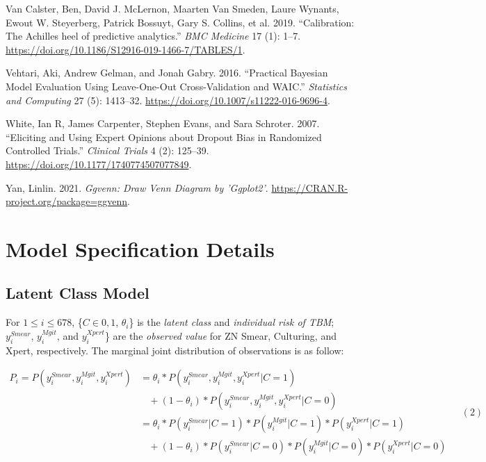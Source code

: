 \documentclass[
]{article}
\newlength{\cslhangindent}
\newlength{\cslentryspacingunit} %
\newenvironment{CSLReferences}[2] %
 {%
  \setlength{\parindent}{0pt}
  \ifodd #1
  \let\oldpar\par
  \def\par{\hangindent=\cslhangindent\oldpar}
  \fi
  \setlength{\parskip}{#2\cslentryspacingunit}
 }%
 {}
\begin{document}
\begin{CSLReferences}{1}{0}
\leavevmode{}%
Van Calster, Ben, David J. McLernon, Maarten Van Smeden, Laure Wynants, Ewout W. Steyerberg, Patrick Bossuyt, Gary S. Collins, et al. 2019. {``{Calibration: The Achilles heel of predictive analytics}.''} \emph{BMC Medicine} 17 (1): 1--7. \url{https://doi.org/10.1186/S12916-019-1466-7/TABLES/1}.

\leavevmode{}%
Vehtari, Aki, Andrew Gelman, and Jonah Gabry. 2016. {``Practical Bayesian Model Evaluation Using Leave-One-Out Cross-Validation and WAIC.''} \emph{Statistics and Computing} 27 (5): 1413--32. \url{https://doi.org/10.1007/s11222-016-9696-4}.

\leavevmode{}%
White, Ian R, James Carpenter, Stephen Evans, and Sara Schroter. 2007. {``Eliciting and Using Expert Opinions about Dropout Bias in Randomized Controlled Trials.''} \emph{Clinical Trials} 4 (2): 125--39. \url{https://doi.org/10.1177/1740774507077849}.

\leavevmode{}%
Yan, Linlin. 2021. \emph{Ggvenn: Draw Venn Diagram by 'Ggplot2'}. \url{https://CRAN.R-project.org/package=ggvenn}.

\end{CSLReferences}

\hypertarget{appendix-appendix}{%
\appendix}


\hypertarget{appendix-details}{%
\section{Model Specification Details}\label{appendix-details}}

\hypertarget{latent-class-model}{%
\subsection{Latent Class Model}\label{latent-class-model}}

For \(1 \leq i \leq 678\), \{\(C \in {0,1}\), \(\theta_i\)\} is the \emph{latent class} and \emph{individual risk of TBM}; \(y^{Smear}_i\), \(y^{Mgit}_i\), and \(y^{Xpert}_i\)\} are the \emph{observed value} for ZN Smear, Culturing, and Xpert, respectively. The marginal joint distribution of observations is as follow:

\[
\begin{aligned}
P_i = P(y^{Smear}_i,y^{Mgit}_i,y^{Xpert}_i) &= \theta_i * P(y^{Smear}_i,y^{Mgit}_i,y^{Xpert}_i|C=1)\\ 
&\ \ \ \ + (1-\theta_i) * P(y^{Smear}_i,y^{Mgit}_i,y^{Xpert}_i|C=0) \\
&= \theta_i * P(y^{Smear}_i | C=1) * P(y^{Mgit}_i | C=1) * P(y^{Xpert}_i | C=1) \\
&\ \ \ \ + (1-\theta_i) *  P(y^{Smear}_i | C=0) * P(y^{Mgit}_i | C=0) * P(y^{Xpert}_i | C=0)
\end{aligned} 
\;\;\;\;(
2
)
\]
\end{document}
